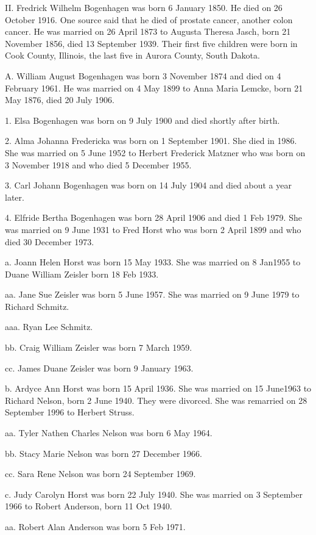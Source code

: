 \documentclass[a4paper]{article}
\begin{document}
II. Fredrick Wilhelm Bogenhagen was born 6 January 1850.  He died on 26 October 1916. One source said that he died of prostate cancer, another colon cancer.  He was married on 26 April 1873 to Augusta Theresa Jasch, born 21 November 1856, died 13 September 1939.  Their first five children were born in Cook County, Illinois, the last five in Aurora County, South Dakota.

A. William August Bogenhagen was born 3 November 1874 and died on 4 February 1961.  	He was married on 4 May 1899 to Anna Maria Lemcke, born 21 May 1876, died 20 July 1906.

1. Elsa Bogenhagen was born on 9 July 1900 and died shortly after birth.

2. Alma Johanna Fredericka was born on 1 September 1901. She died in 1986. She was married on 5 June 1952 to Herbert Frederick Matzner who was born on 3 November 1918 and who died 5 December 1955.

3. Carl Johann Bogenhagen was born on 14 July 1904 and died about a year later.

4. Elfride Bertha Bogenhagen was born 28 April 1906 and died 1 Feb 1979.  She was married on 9 June 1931 to Fred Horst who was born 2 April 1899 and who died 30 December 1973.

a. Joann Helen Horst was born 15 May 1933.  She was married on 8 Jan1955 to Duane William Zeisler born 18 Feb 1933.

aa. Jane Sue Zeisler was born 5 June 1957.  She was married on 9 June 1979 to Richard Schmitz.

aaa. Ryan Lee Schmitz.

bb. Craig William Zeisler was born 7 March 1959.

cc. James Duane Zeisler was born 9 January 1963.

b. Ardyce Ann Horst was born 15 April 1936.  She was married on 15 June1963 to Richard Nelson, born 2 June 1940.  They were divorced.  She was remarried on 28 September 1996 to Herbert Struss.

aa. Tyler Nathen Charles Nelson  was born 6 May 1964.

bb. Stacy Marie Nelson was born 27 December 1966.

cc. Sara Rene Nelson was born 24 September 1969.

c. Judy Carolyn Horst was born 22 July 1940.  She was married on 3 September 1966 to Robert Anderson, born 11 Oct 1940.

aa. Robert Alan Anderson was born 5 Feb 1971.
\end{document}
